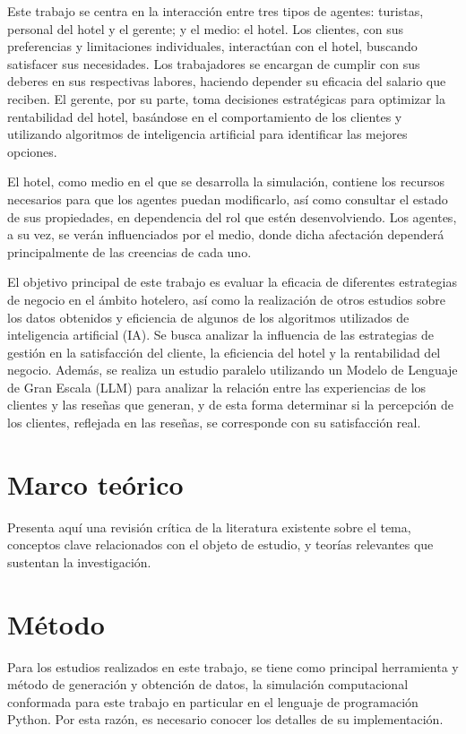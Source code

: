\documentclass[12pt,a4paper]{article} \usepackage[spanish]{babel} \usepackage{graphicx} \usepackage{amsmath} \usepackage{amsfonts} \usepackage{amssymb} \usepackage{float} \usepackage{geometry}
\begin{document}
Este trabajo se centra en la interacción entre tres tipos de agentes: turistas, personal del hotel y el gerente; y el medio: el hotel. Los clientes, con sus preferencias y limitaciones individuales, interactúan con el hotel, buscando satisfacer sus necesidades. Los trabajadores se encargan de cumplir con sus deberes en sus respectivas labores, haciendo depender su eficacia del salario que reciben. El gerente, por su parte, toma decisiones estratégicas para optimizar la rentabilidad del hotel, basándose en el comportamiento de los clientes y utilizando algoritmos de inteligencia artificial para identificar las mejores opciones.

El hotel, como medio en el que se desarrolla la simulación, contiene los recursos necesarios para que los agentes puedan modificarlo, así como consultar el estado de sus propiedades, en dependencia del rol que estén desenvolviendo. Los agentes, a su vez, se verán influenciados por el medio, donde dicha afectación dependerá principalmente de las creencias de cada uno.

El objetivo principal de este trabajo es evaluar la eficacia de diferentes estrategias de negocio en el ámbito hotelero, así como la realización de otros estudios sobre los datos obtenidos y eficiencia de algunos de los algoritmos utilizados de inteligencia artificial (IA). Se busca analizar la influencia de las estrategias de gestión en la satisfacción del cliente, la eficiencia del hotel y la rentabilidad del negocio. Además, se realiza un estudio paralelo utilizando un Modelo de Lenguaje de Gran Escala (LLM) para analizar la relación entre las experiencias de los clientes y las reseñas que generan, y de esta forma determinar si la percepción de los clientes, reflejada en las reseñas, se corresponde con su satisfacción real.

\section{Marco teórico}

Presenta aquí una revisión crítica de la literatura existente sobre el tema, conceptos clave relacionados con el objeto de estudio, y teorías relevantes que sustentan la investigación.

\section{Método}

Para los estudios realizados en este trabajo, se tiene como principal herramienta y método de generación y obtención de datos, la simulación computacional conformada para este trabajo en particular en el lenguaje de programación Python. Por esta razón, es necesario conocer los detalles de su implementación.
\end{document}
